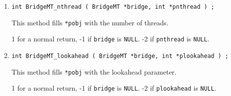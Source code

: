 \begin{enumerate}
\item
\begin{verbatim}
int BridgeMT_nthread ( BridgeMT *bridge, int *pnthread ) ;
\end{verbatim}
This method fills \texttt{*pobj} with the number of threads.
\par {}
1 for a normal return, 
-1 if \texttt{bridge} is \texttt{NULL}.
-2 if \texttt{pnthread} is \texttt{NULL}.
\item
\begin{verbatim}
int BridgeMT_lookahead ( BridgeMT *bridge, int *plookahead ) ;
\end{verbatim}
This method fills \texttt{*pobj} with the lookahead parameter.
\par {}
1 for a normal return, 
-1 if \texttt{bridge} is \texttt{NULL}.
-2 if \texttt{plookahead} is \texttt{NULL}.
\end{enumerate}
\par
